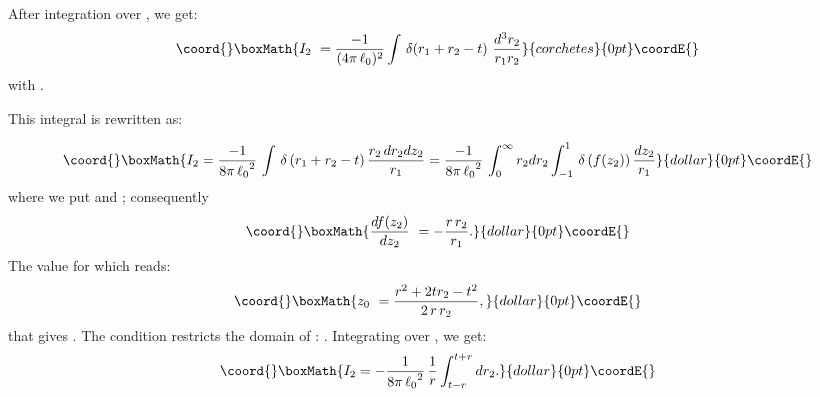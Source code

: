 \documentclass[a4paper,12pt]{article}
\begin{document}
After integration over  \coordHE{}, we get:
\[\coord{}\boxMath{
I_{2}\ =\frac{-1}{(4\pi\,{\ell_{0}})^2}
\int\,\delta\!\left(r_{1}+r_{2}-t\right)\,\frac{d^{3}r_{2}}
{r_{1}r_{2}}
}{corchetes}{0pt}\coordE{}\]
with \coordHE{}.
\par\noindent

This integral is rewritten as:

$$\coord{}\boxMath{
I_{2}=\frac{-1}{8\pi\,{\ell_{0}}^{2}}\,\int\,
\delta\left(r_{1}+r_{2} -t\right) \frac{r_{2}\,dr_{2}d z_2}{r_{1}}
= \frac{-1}{8\pi\,{\ell_{0}}^{2}}\,\int_0^{\infty} r_2
dr_2\int_{-1}^1\, \delta\left(f(z_2)\right) \frac{d z_2}{r_{1}}
}{dollar}{0pt}\coordE{}$$
where we put \coordHE{} and \coordHE{}; consequently
$$\coord{}\boxMath{\frac{df(z_2)}{d z_2}\ =-\frac{r\,r_{2}}{r_{1}}.}{dollar}{0pt}\coordE{}$$
The value  \coordHE{} for which \coordHE{} reads:
$$\coord{}\boxMath{z_{0}\ =\frac{r^{2}+2t r_{2} -t^{2}}{2\,r\,r_{2}},}{dollar}{0pt}\coordE{}$$
that gives \coordHE{}. The condition \coordHE{}
restricts the domain of \coordHE{}: \coordHE{}. Integrating over
\coordHE{}, we get:
$$\coord{}\boxMath{
I_{2}=-\frac{1}{8\pi\,{\ell_{0}}^{2}}\,\frac{1}{r}\int_{t-r}^{t+r}
dr_2.
}{dollar}{0pt}\coordE{}$$
\end{document}
